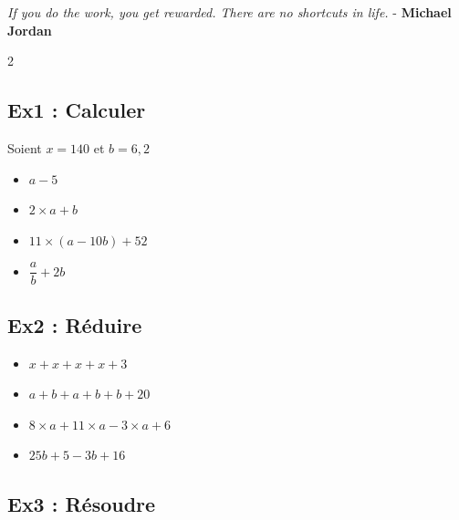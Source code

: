 



\begin{center}
  \textit{If you do the work, you get rewarded. There are no shortcuts in life.}  - \textbf{Michael Jordan}
\end{center}

\begin{multicols}{2} 

\subsection*{Ex1 : Calculer}
Soient $x = 140$ et $b = 6,2$ 

\begin{itemize}[label={$\bullet$}]
  \item $a - 5$ \\
  \item $2 \times a + b $ \\
  \item $11 \times  (a - 10b) + 52 $ \\
  \item $\dfrac{a}{b} + 2b $ 
\end{itemize} \columnbreak

\subsection*{Ex2 : Réduire}

\begin{itemize}[label={$\bullet$}]
  \item $x + x + x + x + 3 $ \\
  \item $a + b + a + b + b + 20 $ \\
  \item $8 \times  a+ 11 \times  a - 3 \times a + 6$ \\
  \item $25b + 5 - 3b + 16 $ 
\end{itemize} 

\end{multicols}

\subsection*{Ex3 : Résoudre}

